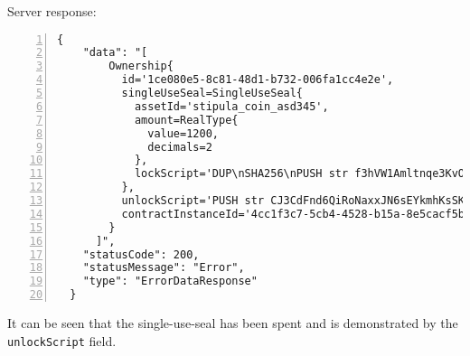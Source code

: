 \newpage
Server response:
\begin{Verbatim}[numbers=left,xleftmargin=1cm,firstnumber=1,breaklines=true,breakanywhere=true,tabsize=2]
  {
    "data": "[
        Ownership{
          id='1ce080e5-8c81-48d1-b732-006fa1cc4e2e', 
          singleUseSeal=SingleUseSeal{
            assetId='stipula_coin_asd345', 
            amount=RealType{
              value=1200, 
              decimals=2
            }, 
            lockScript='DUP\nSHA256\nPUSH str f3hVW1Amltnqe3KvOT00eT7AU23FAUKdgmCluZB+nss=\nEQUAL\nCHECKSIG\nHALT\n'
          }, 
          unlockScript='PUSH str CJ3CdFnd6QiRoNaxxJN6sEYkmhKsSKi0SP5YXiSGhygZs+EMyE2bPrI+hRL4PSA0vLh0X6PNpDhTaPxx4kc1LEk9su8+6kkDvi3xpLG9bDoPjss+LEPXUjPTcGVB/3jITb8W+GmX1kDYhGHKtSuhvxBjTwwbtok4gRDD1BcMX/o=\nPUSH str MIGfMA0GCSqGSIb3DQEBAQUAA4GNADCBiQKBgQDErzzgD2ZslZxciFAiX3/ot7lrkZDw4148jFZrsDZPE6CVs9xXFSHGgy/mFvIFLXhnChO6Nyd2be3lbgeavLMCMVUiTStXr117Km17keWpb3sItkKKsLFBOcIIU8XXowI/OhzQN2XPZYESHgjdQ5vwEj2YyueiS7WKP94YWz/pswIDAQAB\n', 
          contractInstanceId='4cc1f3c7-5cb4-4528-b15a-8e5cacf5b18a'
        }
      ]",
    "statusCode": 200,
    "statusMessage": "Error",
    "type": "ErrorDataResponse"
  }
\end{Verbatim}

It can be seen that the single-use-seal has been spent and is demonstrated by the \verb|unlockScript| 
field.
